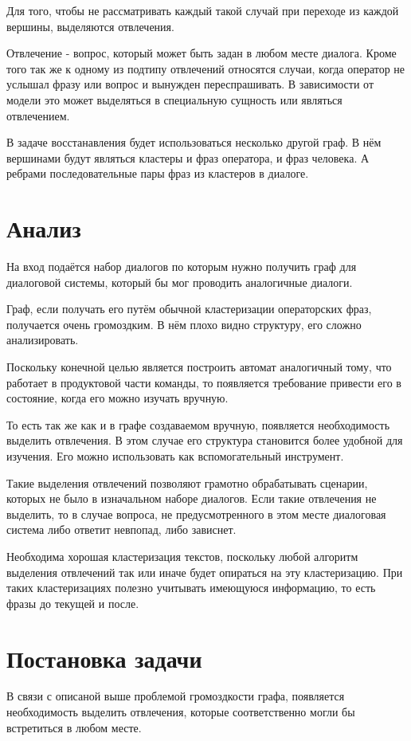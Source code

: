 \documentclass[specification,annotation]{itmo-student-thesis}
\begin{document}
	Для того, чтобы не рассматривать каждый такой случай при переходе из каждой вершины, выделяются $\textbf{отвлечения}$. 
	
	$\textbf{Отвлечение}$ - вопрос, который может быть задан в любом месте диалога. Кроме того так же к одному из подтипу отвлечений относятся случаи, когда оператор не услышал фразу или вопрос и вынужден переспрашивать. В зависимости от модели это может выделяться в специальную сущность или являться отвлечением.
	
	В задаче восстанавления будет использоваться несколько другой граф. В нём вершинами будут являться кластеры и фраз оператора, и фраз человека. А ребрами последовательные пары фраз из кластеров в диалоге.
	
	\section{Анализ}
	На вход подаётся набор диалогов по которым нужно получить граф для диалоговой системы, который бы мог проводить аналогичные диалоги.
	
	Граф, если получать его путём обычной кластеризации операторских фраз, получается очень громоздким. В нём плохо видно структуру, его сложно анализировать.
	
	Поскольку конечной целью является построить автомат аналогичный тому, что работает в продуктовой части команды, то появляется требование привести его в состояние, когда его можно изучать вручную. 
	
	То есть так же как и в графе создаваемом вручную, появляется необходимость выделить отвлечения. В этом случае его структура становится более удобной для изучения. Его можно использовать как вспомогательный инструмент. 
	
	Такие выделения отвлечений позволяют грамотно обрабатывать сценарии, которых не было в изначальном наборе диалогов. Если такие отвлечения не выделить, то в случае вопроса, не предусмотренного в этом месте диалоговая система либо ответит невпопад, либо зависнет.
	
	Необходима хорошая кластеризация текстов, поскольку любой алгоритм выделения отвлечений так или иначе будет опираться на эту кластеризацию. При таких кластеризациях полезно учитывать имеющуюся информацию, то есть фразы до текущей и после.
	
	
	\section{Постановка задачи}
	В связи с описаной выше проблемой громоздкости графа, появляется необходимость выделить отвлечения, которые соответственно могли бы встретиться в любом месте.
	
\end{document}
